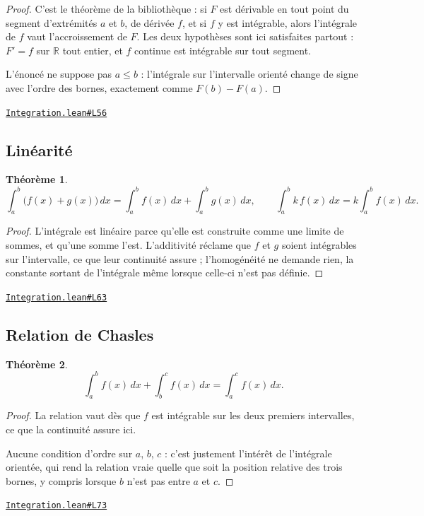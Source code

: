 \documentclass[11pt,a4paper]{article}
\theoremstyle{definition}
\theoremstyle{plain}
\newtheorem{theoreme}{Théorème}
\newcommand{\source}[2]{\par\smallskip\noindent\hfill{\footnotesize\href{#1}{\texttt{#2}}}\par\smallskip}
\begin{document}
\begin{proof}
C'est le théorème de la bibliothèque : si $F$ est dérivable en tout point du segment
d'extrémités $a$ et $b$, de dérivée $f$, et si $f$ y est intégrable, alors l'intégrale de
$f$ vaut l'accroissement de $F$. Les deux hypothèses sont ici satisfaites partout :
$F' = f$ sur $\mathbb{R}$ tout entier, et $f$ continue est intégrable sur tout segment.

\medskip\noindent
L'énoncé ne suppose pas $a \le b$ : l'intégrale sur l'intervalle orienté change de signe
avec l'ordre des bornes, exactement comme $F(b) - F(a)$.
\end{proof}
\source{https://github.com/Commutator-IO/learn-lean/blob/main/courses/02-lycee/06-integration/Integration.lean\#L56}{Integration.lean\#L56}

\subsection{Linéarité}

\begin{theoreme}
\[ \int_a^b \bigl(f(x) + g(x)\bigr)\,dx = \int_a^b f(x)\,dx + \int_a^b g(x)\,dx ,
   \qquad \int_a^b k\,f(x)\,dx = k \int_a^b f(x)\,dx . \]
\end{theoreme}

\begin{proof}
L'intégrale est linéaire parce qu'elle est construite comme une limite de sommes, et
qu'une somme l'est. L'additivité réclame que $f$ et $g$ soient intégrables sur l'intervalle, ce que leur continuité assure ; l'homogénéité ne demande
rien, la constante sortant de l'intégrale même lorsque celle-ci n'est pas définie.
\end{proof}
\source{https://github.com/Commutator-IO/learn-lean/blob/main/courses/02-lycee/06-integration/Integration.lean\#L63}{Integration.lean\#L63}

\subsection{Relation de Chasles}

\begin{theoreme}
\[ \int_a^b f(x)\,dx + \int_b^c f(x)\,dx = \int_a^c f(x)\,dx . \]
\end{theoreme}

\begin{proof}
La relation vaut dès que $f$ est intégrable sur les deux premiers intervalles, ce que la
continuité assure ici.

\medskip\noindent
Aucune condition d'ordre sur $a$, $b$, $c$ : c'est justement l'intérêt de l'intégrale
orientée, qui rend la relation vraie quelle que soit la position relative des trois
bornes, y compris lorsque $b$ n'est pas entre $a$ et $c$.
\end{proof}
\source{https://github.com/Commutator-IO/learn-lean/blob/main/courses/02-lycee/06-integration/Integration.lean\#L73}{Integration.lean\#L73}
\end{document}
